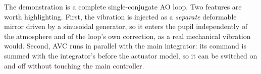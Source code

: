\documentclass[11pt]{article}
\begin{document}
The demonstration is a complete single-conjugate AO loop.
%
%
%
Two features are worth highlighting.
%
First, the vibration is injected as a \emph{separate} deformable mirror driven by a sinusoidal generator, so it enters the pupil independently of the atmosphere and of the loop's own correction, as a real mechanical vibration would.
%
Second, AVC runs in parallel with the main integrator: its command is summed with the integrator's before the actuator model, so it can be switched on and off without touching the main controller.
%

\end{document}
